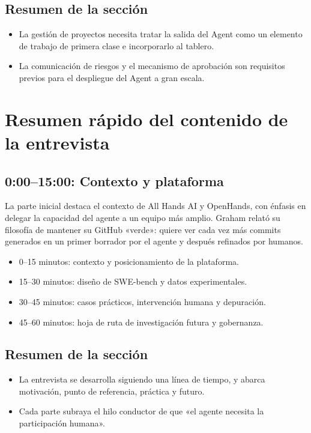 \documentclass[a4paper]{article}
\begin{document}
\subsection{Resumen de la sección}
\begin{itemize}
    \item La gestión de proyectos necesita tratar la salida del Agent como un elemento de trabajo de primera clase e incorporarlo al tablero.
    \item La comunicación de riesgos y el mecanismo de aprobación son requisitos previos para el despliegue del Agent a gran escala.
\end{itemize}

\section{Resumen rápido del contenido de la entrevista}
\subsection{0:00--15:00: Contexto y plataforma}
La parte inicial destaca el contexto de All Hands AI y OpenHands, con énfasis en delegar la capacidad del agente a un equipo más amplio. Graham relató su filosofía de mantener su GitHub «verde»: quiere ver cada vez más commits generados en un primer borrador por el agente y después refinados por humanos.

\begin{itemize}
    \item 0--15 minutos: contexto y posicionamiento de la plataforma.
    \item 15--30 minutos: diseño de SWE-bench y datos experimentales.
    \item 30--45 minutos: casos prácticos, intervención humana y depuración.
    \item 45--60 minutos: hoja de ruta de investigación futura y gobernanza.
\end{itemize}

\subsection{Resumen de la sección}
\begin{itemize}
    \item La entrevista se desarrolla siguiendo una línea de tiempo, y abarca motivación, punto de referencia, práctica y futuro.
    \item Cada parte subraya el hilo conductor de que «el agente necesita la participación humana».
\end{itemize}
\end{document}
